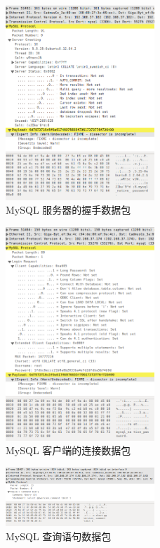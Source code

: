 \begin{figure}[h!]
    \caption{MySQL 服务器的握手数据包}
    \label{fig:mysql-server-hs}
    \centering
    \includegraphics[width=0.5\textwidth]{mysql-server-hs.png}
\end{figure}

\begin{figure}[h!]
    \caption{MySQL 客户端的连接数据包}
    \label{fig:mysql-client-conn}
    \centering
    \includegraphics[width=0.5\textwidth]{mysql-client-conn.png}
\end{figure}

\begin{figure}[h!]
    \caption{MySQL 查询语句数据包}
    \label{fig:mysql-select}
    \centering
    \includegraphics[width=0.5\textwidth]{mysql-select.png}
\end{figure}

